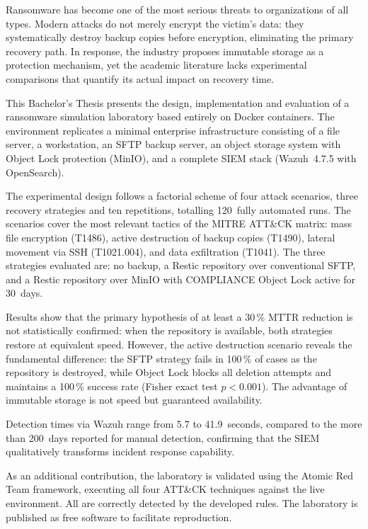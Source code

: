 \documentclass[../main.tex]{subfiles}
\begin{document}
Ransomware has become one of the most serious threats to organizations of
all types. Modern attacks do not merely encrypt the victim's data: they
systematically destroy backup copies before encryption, eliminating the
primary recovery path. In response, the industry proposes immutable storage
as a protection mechanism, yet the academic literature lacks experimental
comparisons that quantify its actual impact on recovery time.

This Bachelor's Thesis presents the design, implementation and evaluation
of a ransomware simulation laboratory based entirely on Docker containers.
The environment replicates a minimal enterprise infrastructure consisting
of a file server, a workstation, an SFTP backup server, an object storage
system with Object Lock protection (MinIO), and a complete SIEM stack
(Wazuh~4.7.5 with OpenSearch).

The experimental design follows a factorial scheme of four attack scenarios,
three recovery strategies and ten repetitions, totalling 120~fully automated
runs. The scenarios cover the most relevant tactics of the MITRE ATT\&CK
matrix: mass file encryption (T1486), active destruction of backup copies
(T1490), lateral movement via SSH (T1021.004), and data exfiltration
(T1041). The three strategies evaluated are: no backup, a Restic repository
over conventional SFTP, and a Restic repository over MinIO with COMPLIANCE
Object Lock active for 30~days.

Results show that the primary hypothesis of at least a 30\,\% MTTR reduction
is not statistically confirmed: when the repository is available, both
strategies restore at equivalent speed. However, the active destruction
scenario reveals the fundamental difference: the SFTP strategy fails in
100\,\% of cases as the repository is destroyed, while Object Lock blocks
all deletion attempts and maintains a 100\,\% success rate (Fisher exact
test $p < 0.001$). The advantage of immutable storage is not speed but
guaranteed availability.

Detection times via Wazuh range from 5.7 to 41.9~seconds, compared to the
more than 200~days reported for manual detection, confirming that the SIEM
qualitatively transforms incident response capability.

As an additional contribution, the laboratory is validated using the Atomic
Red Team framework, executing all four ATT\&CK techniques against the live
environment. All are correctly detected by the developed rules. The
laboratory is published as free software to facilitate reproduction.
\end{document}
